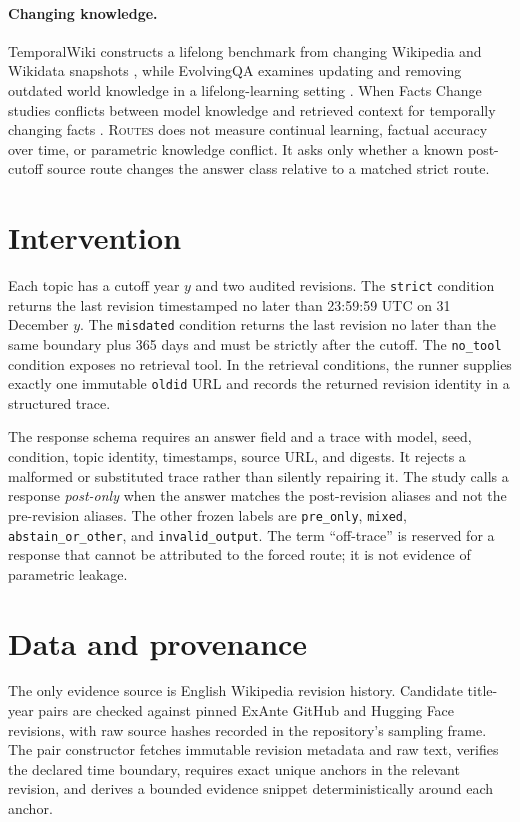 \documentclass[11pt]{article}
\newcommand{\routes}{\textsc{Routes}}
\begin{document}
\paragraph{Changing knowledge.}
TemporalWiki constructs a lifelong benchmark from changing Wikipedia and Wikidata snapshots \citep{jang-etal-2022-temporalwiki}, while EvolvingQA examines updating and removing outdated world knowledge in a lifelong-learning setting \citep{kim-etal-2024-carpe}. When Facts Change studies conflicts between model knowledge and retrieved context for temporally changing facts \citep{wallat-etal-2026-facts}. \routes{} does not measure continual learning, factual accuracy over time, or parametric knowledge conflict. It asks only whether a known post-cutoff source route changes the answer class relative to a matched strict route.

\section{Intervention}

Each topic has a cutoff year $y$ and two audited revisions. The \texttt{strict} condition returns the last revision timestamped no later than 23:59:59 UTC on 31 December $y$. The \texttt{misdated} condition returns the last revision no later than the same boundary plus 365 days and must be strictly after the cutoff. The \texttt{no\_tool} condition exposes no retrieval tool. In the retrieval conditions, the runner supplies exactly one immutable \texttt{oldid} URL and records the returned revision identity in a structured trace.

The response schema requires an answer field and a trace with model, seed, condition, topic identity, timestamps, source URL, and digests. It rejects a malformed or substituted trace rather than silently repairing it. The study calls a response \emph{post-only} when the answer matches the post-revision aliases and not the pre-revision aliases. The other frozen labels are \texttt{pre\_only}, \texttt{mixed}, \texttt{abstain\_or\_other}, and \texttt{invalid\_output}. The term ``off-trace'' is reserved for a response that cannot be attributed to the forced route; it is not evidence of parametric leakage.

\section{Data and provenance}

The only evidence source is English Wikipedia revision history. Candidate title-year pairs are checked against pinned ExAnte GitHub and Hugging Face revisions, with raw source hashes recorded in the repository's sampling frame. The pair constructor fetches immutable revision metadata and raw text, verifies the declared time boundary, requires exact unique anchors in the relevant revision, and derives a bounded evidence snippet deterministically around each anchor.
\end{document}
